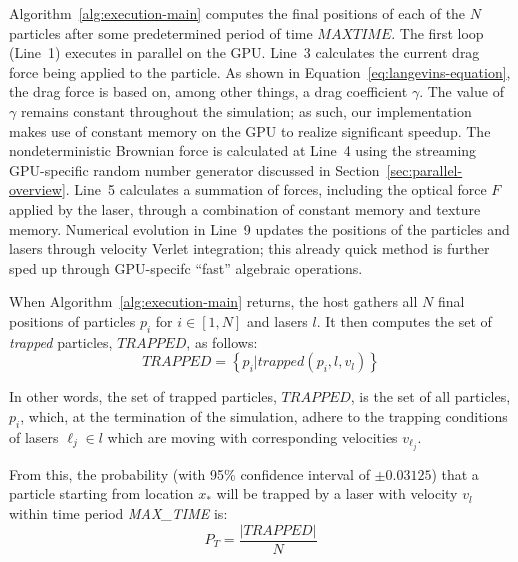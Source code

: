 Algorithm~\ref{alg:execution-main} computes the final positions of each of the $N$ particles after some predetermined
period of time $\textit{MAXTIME}$.  The first loop (Line~1) executes in parallel on the GPU.  Line~3 calculates the
current drag force being applied to the particle.  As shown in Equation~\ref{eq:langevins-equation}, the drag force is
based on, among other things, a drag coefficient $\gamma$.  The value of $\gamma$ remains constant throughout the
simulation; as such, our implementation makes use of constant memory on the GPU to realize significant speedup. 
The nondeterministic Brownian force is calculated at Line~4 using the streaming GPU-specific random number generator
discussed in Section~\ref{sec:parallel-overview}.  Line~5 calculates a summation of forces, including the optical
force $F$ applied by the laser, through a combination of constant memory and texture memory.  Numerical evolution in
Line~9 updates the positions of the particles and lasers through velocity Verlet integration; this already quick method
is further sped up through GPU-specifc ``fast'' algebraic operations.

When Algorithm~\ref{alg:execution-main} returns, the host gathers all
$N$ final positions of particles $p_i$ for $i \in [1,N]$ and lasers
$l$. It then computes the set of {\em trapped} particles,
$\textit{TRAPPED}$, as follows:
\begin{equation}
\textit{TRAPPED} = \left\{ p_i | \textit{trapped}(p_i, l, v_l) \right\}
\end{equation}

In other words, the set of trapped particles, $\textit{TRAPPED}$, is the set of all particles, $p_{i}$, which, at the termination of the simulation, adhere to the trapping conditions of lasers $\ell_{j} \in l$ which are moving with corresponding velocities $v_{\ell_{j}}$.

From this, the probability (with 95\% confidence interval of $\pm 0.03125$) that a particle starting from location $x_*$
will be trapped by a laser with velocity $v_l$ within time period \textit{MAX\_TIME} is:
\begin{equation}
     P_T = \frac{\left|\textit{TRAPPED}\right|}{N}
\end{equation}

%
